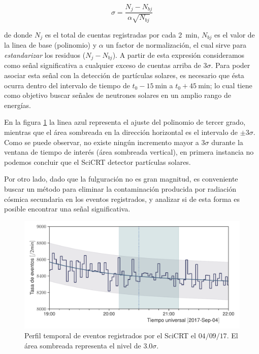 \begin{equation}
\sigma=\frac{N_{j}-N_{bj}}{\alpha\sqrt{N_{bj}}}
\end{equation}

de donde $N_{j}$ es el total de cuentas registradas por cada \SI{2}{\minute}, $N_{bj}$ es el valor de la linea de base (polinomio) y $\alpha$ un factor de normalización, el cual sirve para \emph{estandarizar} los residuos ($N_{j}-N_{bj}$). A partir de esta expresión consideramos como señal significativa a cualquier exceso de cuentas arriba de $3\sigma$. Para poder asociar esta señal con la detección de partículas solares, es necesario que ésta ocurra dentro del intervalo de tiempo de $t_{0}-\SI{15}{\minute}$ a $t_{0}+\SI{45}{\minute}$; lo cual tiene como objetivo buscar señales de neutrones solares en un amplio rango de energías.

En la figura \ref{fig:september-04-neutrons} la linea azul representa el ajuste del polinomio de tercer grado, mientras que el área sombreada en la dirección horizontal es el intervalo de $\pm 3\sigma$. Como se puede observar, no existe ningún incremento mayor a $3\sigma$ durante la ventana de tiempo de interés (área sombreada vertical), en primera instancia no podemos concluir que el SciCRT detector partículas solares.

Por otro lado, dado que la fulguración no es gran magnitud, es conveniente buscar un método para eliminar la contaminación producida por radiación cósmica secundaria en los eventos registrados, y analizar si de esta forma es posible encontrar una señal significativa.

\begin{figure}
        \centering
        \includegraphics[width=\textwidth]{neutron-170904.pdf}
        \caption{Perfil temporal de eventos registrados por el SciCRT el $04/09/17$. El área sombreada representa el nivel de $3.0\sigma$.}
        \label{fig:september-04-neutrons}
\end{figure}


